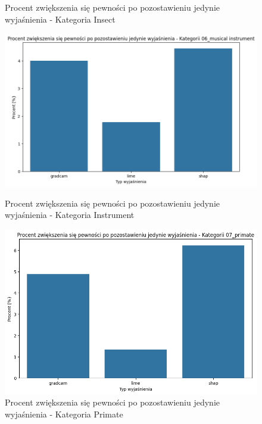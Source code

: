 \begin{figure}
\begin{minipage}[b]{0.3\textwidth}
		\caption{Procent zwiększenia się pewności po pozostawieniu jedynie wyjaśnienia - Kategoria Insect}  \label{rys:base_confidence_womask_percent_insect}
	\end{minipage}
\end{figure}
\begin{figure}
	\centering
	\begin{minipage}[b]{0.3\textwidth}
		\centering\includegraphics[width=.9\textwidth]{img/base_confidence_womask_percent_music}
		\caption{Procent zwiększenia się pewności po pozostawieniu jedynie wyjaśnienia - Kategoria Instrument}  \label{rys:base_confidence_womask_percent_music}
	\end{minipage}
	\begin{minipage}[b]{0.3\textwidth}
		\centering\includegraphics[width=.9\textwidth]{img/base_confidence_womask_percent_primate}
		\caption{Procent zwiększenia się pewności po pozostawieniu jedynie wyjaśnienia - Kategoria Primate}  \label{rys:base_confidence_womask_percent_primate}
	\end{minipage}
	\begin{minipage}[b]{0.3\textwidth}

\end{minipage}
\end{figure}
